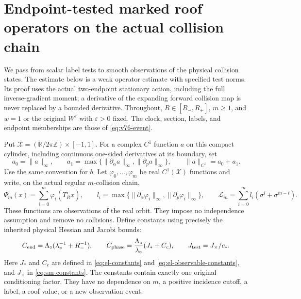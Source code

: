 \section{Endpoint-tested marked roof operators on the actual collision chain}
\label{sec:wo-endpoint-tests}

We pass from scalar label tests to smooth observations of the physical
collision states.  The estimate below is a weak operator estimate with
specified test norms.  Its proof uses the actual two-endpoint stationary
action, including the full inverse-gradient moment; a derivative of the
expanding forward collision map is never replaced by a bounded derivative.
Throughout, $R\in[R_-,R_+]$, $m\ge1$, and $w=1$ or the original
$W^\varepsilon$ with $\varepsilon>0$ fixed.  The clock, section, labels,
and endpoint memberships are those of \eqref{eq:v76-event}.

Put $\mathcal X=(\mathbb R/2\pi\mathbb Z)\times[-1,1]$.  For a complex
$C^1$ function $a$ on this compact cylinder, including continuous
one-sided derivatives at its boundary, set
\begin{equation}\label{eq:wo-test-norm}
 a_0=\|a\|_\infty,\qquad
 a_1=\max\{\|\partial_\alpha a\|_\infty,
                         \|\partial_p a\|_\infty\},\qquad
 \|a\|_{C^1}=a_0+a_1.
\end{equation}
Use the same convention for $b$.  Let
$\varphi_0,\ldots,\varphi_m$ be real $C^1(\mathcal X)$ functions and
write, on the actual regular $m$-collision chain,
\begin{equation}\label{eq:wo-phase}
 \Psi_m(x)=\sum_{i=0}^m\varphi_i(T_R^ix),\qquad
 l_i=\max\{\|\partial_\alpha\varphi_i\|_\infty,
                    \|\partial_p\varphi_i\|_\infty\},\qquad
 \mathcal L_m=\sum_{i=0}^m l_i(\sigma^i+\sigma^{m-i}).
\end{equation}
These functions are observations of the real orbit.  They impose no
independence assumption and remove no collisions.  Define constants
using precisely the inherited physical Hessian and Jacobi bounds:
\begin{equation}\label{eq:wo-constants}
 C_{\rm end}=\Lambda_\circ(\lambda_\circ^{-1}+R_-^{-1}),\qquad
 C_{\rm phase}=\frac{\Lambda_\circ}{\lambda_\circ}(J_*+C_c),\qquad
 J_{\rm test}=J_\times/c_*.
\end{equation}
Here $J_*$ and $C_c$ are defined in \eqref{eq:el-constants} and
\eqref{eq:el-observable-constants}, and $J_\times$ in
\eqref{eq:sm-constants}.  The constants contain exactly one original
conditioning factor.  They have no dependence on $m$, a positive
incidence cutoff, a label, a roof value, or a new observation event.

